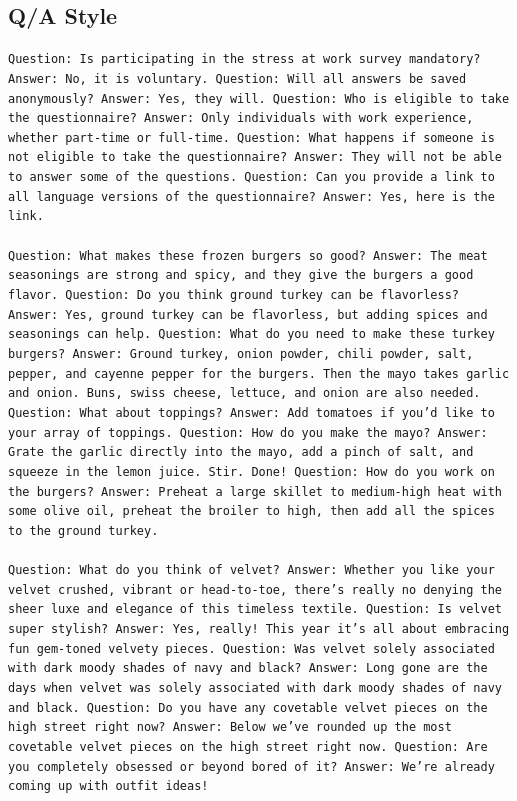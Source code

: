 \subsection*{Q/A Style}
\begin{tcolorbox}[colback=gray!20, colframe=gray!75, rounded corners, sharp corners=northeast, sharp corners=southwest]
\texttt{Question: Is participating in the stress at work survey mandatory? Answer: No, it is voluntary. Question: Will all answers be saved anonymously? Answer: Yes, they will. Question: Who is eligible to take the questionnaire? Answer: Only individuals with work experience, whether part-time or full-time. Question: What happens if someone is not eligible to take the questionnaire? Answer: They will not be able to answer some of the questions. Question: Can you provide a link to all language versions of the questionnaire? Answer: Yes, here is the link.\\\\
Question: What makes these frozen burgers so good? Answer: The meat seasonings are strong and spicy, and they give the burgers a good flavor. Question: Do you think ground turkey can be flavorless? Answer: Yes, ground turkey can be flavorless, but adding spices and seasonings can help. Question: What do you need to make these turkey burgers? Answer: Ground turkey, onion powder, chili powder, salt, pepper, and cayenne pepper for the burgers. Then the mayo takes garlic and onion. Buns, swiss cheese, lettuce, and onion are also needed. Question: What about toppings? Answer: Add tomatoes if you'd like to your array of toppings. Question: How do you make the mayo? Answer: Grate the garlic directly into the mayo, add a pinch of salt, and squeeze in the lemon juice. Stir. Done! Question: How do you work on the burgers? Answer: Preheat a large skillet to medium-high heat with some olive oil, preheat the broiler to high, then add all the spices to the ground turkey.\\\\
Question: What do you think of velvet? Answer: Whether you like your velvet crushed, vibrant or head-to-toe, there's really no denying the sheer luxe and elegance of this timeless textile. Question: Is velvet super stylish? Answer: Yes, really! This year it's all about embracing fun gem-toned velvety pieces. Question: Was velvet solely associated with dark moody shades of navy and black? Answer: Long gone are the days when velvet was solely associated with dark moody shades of navy and black. Question: Do you have any covetable velvet pieces on the high street right now? Answer: Below we've rounded up the most covetable velvet pieces on the high street right now. Question: Are you completely obsessed or beyond bored of it? Answer: We're already coming up with outfit ideas!\\\\
}
\end{tcolorbox}
